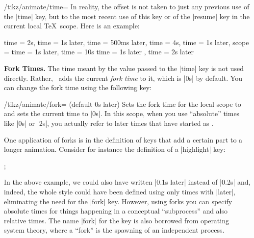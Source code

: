 \begin{key}{/tikz/animate/time=}
    In reality, the offset is not taken to just any previous use of the |time|
    key, but to the most recent use of this key or of the |resume| key in the
    current local \TeX\ scope. Here is an example:
\begin{codeexample}
time = 2s,
time = 1s later,    %
time = 500ms later, %
time = 4s,
time = 1s later,    %
scope = {           %
  time = 1s later,  %
  time = 10s
  time = 1s later   %
},                  %
time = 2s later     %
\end{codeexample}

    \medskip\textbf{Fork Times.}
    The time meant by the value  passed to the |time| key is not
    used directly. Rather, \tikzname\ adds the current \emph{fork time} to it,
    which is |0s| by default. You can change the fork time using the following
    key:
    \begin{key}{/tikz/animate/fork= (default 0s later)}
        Sets the fork time for the local scope to  and sets the current
        time to |0s|. In this scope, when you use ``absolute'' times like |0s|
        or |2s|, you actually refer to later times that have started as
        .

        One application of forks is in the definition of keys that add a
        certain part to a longer animation. Consider for instance the
        definition of a |highlight| key:
\begin{codeexample}[
    preamble={\usetikzlibrary{animations}},
    animation list={1.05,1.1,1.15,1.2,2.05,2.1,2.15,2.2},
]
\tikz [animate/highlight/.style = {
    scope = { fork = #1,
              :fill = { 0s = "black", 0.1s = "white", 0.2s = "black"} }
  }]
  ;
\end{codeexample}
        In the above example, we could also have written |0.1s later| instead
        of |0.2s| and, indeed, the whole style could have been defined using
        only times with |later|, eliminating the need for the |fork| key.
        However, using forks you can specify absolute times for things
        happening in a conceptual ``subprocess'' and also relative times. The
        name |fork| for the key is also borrowed from operating system theory,
        where a ``fork'' is the spawning of an independent process.
    \end{key}


\end{key}
